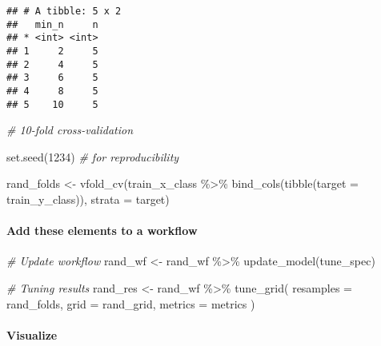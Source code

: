 \documentclass[
]{book}
\newenvironment{Shaded}{\begin{snugshade}}{\end{snugshade}}
\newcommand{\AttributeTok}[1]{\textcolor[rgb]{0.77,0.63,0.00}{#1}}
\newcommand{\CommentTok}[1]{\textcolor[rgb]{0.56,0.35,0.01}{\textit{#1}}}
\newcommand{\DecValTok}[1]{\textcolor[rgb]{0.00,0.00,0.81}{#1}}
\newcommand{\FunctionTok}[1]{\textcolor[rgb]{0.00,0.00,0.00}{#1}}
\newcommand{\NormalTok}[1]{#1}
\newcommand{\OtherTok}[1]{\textcolor[rgb]{0.56,0.35,0.01}{#1}}
\newcommand{\SpecialCharTok}[1]{\textcolor[rgb]{0.00,0.00,0.00}{#1}}
\begin{document}
\begin{verbatim}
## # A tibble: 5 x 2
##   min_n     n
## * <int> <int>
## 1     2     5
## 2     4     5
## 3     6     5
## 4     8     5
## 5    10     5
\end{verbatim}

\begin{Shaded}
\begin{Highlighting}[]
\CommentTok{\# 10{-}fold cross{-}validation}

\FunctionTok{set.seed}\NormalTok{(}\DecValTok{1234}\NormalTok{) }\CommentTok{\# for reproducibility }

\NormalTok{rand\_folds }\OtherTok{\textless{}{-}} \FunctionTok{vfold\_cv}\NormalTok{(train\_x\_class }\SpecialCharTok{\%\textgreater{}\%} \FunctionTok{bind\_cols}\NormalTok{(}\FunctionTok{tibble}\NormalTok{(}\AttributeTok{target =}\NormalTok{ train\_y\_class)),}
                       \AttributeTok{strata =}\NormalTok{ target)}
\end{Highlighting}
\end{Shaded}

\hypertarget{add-these-elements-to-a-workflow-2}{%
\paragraph{Add these elements to a workflow}\label{add-these-elements-to-a-workflow-2}}

\begin{Shaded}
\begin{Highlighting}[]
\CommentTok{\# Update workflow }
\NormalTok{rand\_wf }\OtherTok{\textless{}{-}}\NormalTok{ rand\_wf }\SpecialCharTok{\%\textgreater{}\%} \FunctionTok{update\_model}\NormalTok{(tune\_spec)}

\CommentTok{\# Tuning results }
\NormalTok{rand\_res }\OtherTok{\textless{}{-}}\NormalTok{ rand\_wf }\SpecialCharTok{\%\textgreater{}\%}
  \FunctionTok{tune\_grid}\NormalTok{(}
    \AttributeTok{resamples =}\NormalTok{ rand\_folds, }
    \AttributeTok{grid =}\NormalTok{ rand\_grid,}
    \AttributeTok{metrics =}\NormalTok{ metrics}
\NormalTok{  )}
\end{Highlighting}
\end{Shaded}

\hypertarget{visualize-2}{%
\paragraph{Visualize}\label{visualize-2}}
\end{document}
